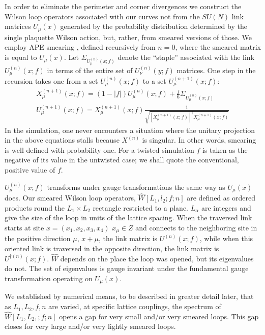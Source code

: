 In order to eliminate the perimeter and corner
divergences \cite{div9} we construct the Wilson loop operators
associated with our curves not from the $SU(N)$ link matrices
$U_\mu (x)$ generated by the probability distribution determined
by the single plaquette Wilson action, but, rather, from smeared
versions of those. We employ APE smearing \cite{ape10}, defined
recursively from $n=0$, where the smeared matrix is equal to
$U_\mu(x)$. Let $\Sigma_{U^{(n)}_\mu (x;f)}$ denote the ``staple''
associated with the link $U^{(n)}_\mu(x;f)$ in terms of the entire
set of $U^{(n)}_\nu(y;f)$ matrices. One step in the recursion
takes one from a set $U^{(n)}_\mu (x;f)$ to a set $U^{(n+1)}_\mu
(x;f)$:
\begin{eqnarray}
X^{(n+1)}_\mu (x;f)= (1-|f|) U^{(n)}_\mu (x;f)+\frac{f}{6}
\Sigma_{U^{(n)}_\mu (x;f)}\nonumber\\ U^{(n+1)}_\mu (x; f
)=X^{(n+1)}_\mu (x;f) \frac{1}{\sqrt{[X^{(n+1)}_\mu (x;f)]^\dagger
X^{(n+1)}_\mu (x;f)}}
\end{eqnarray}
In the simulation, one never encounters a situation where the
unitary projection in the above equations stalls because $X^{(n)}$
is singular. In other words, smearing is well defined with
probability one.
For a twisted simulation $f$ is taken as the
negative of its value in the untwisted case; we shall quote the
conventional, positive value of $f$.

$U^{(n)}_\mu (x;f)$ transforms under gauge transformations the
same way as $U_\mu (x)$ does. Our smeared Wilson loop operators,
$\hat W [L_1,l_2 ; f ; n]$ are defined as ordered products round
the $L_1 \times L_2$ rectangle restricted to a plane. $L_\alpha$
are integers and give the size of the loop in units of the lattice
spacing. When the traversed link starts at site
$x=(x_1,x_2,x_3,x_4)$ $ x_\mu\in Z$ and connects to the
neighboring site in the positive direction $\mu$, $x+\mu$, the
link matrix is $U^{(n)}(x;f)$, while when this oriented link is
traversed in the opposite direction, the link matrix is
$U^{\dagger (n)}(x;f)$. $\hat W$ depends on the place the loop was
opened, but its eigenvalues do not. The set of eigenvalues is
gauge invariant under the fundamental gauge transformation
operating on $U_\mu (x)$.

We established by numerical means, to be described in greater
detail later, that as $L_1 , L_2 , f, n$ are varied, at specific
lattice couplings, the spectrum of $\hat W [L_1 , L_2 ,; f ; n] $
opens a gap for very small and/or very smeared loops. This gap
closes for very large and/or very lightly smeared loops.


